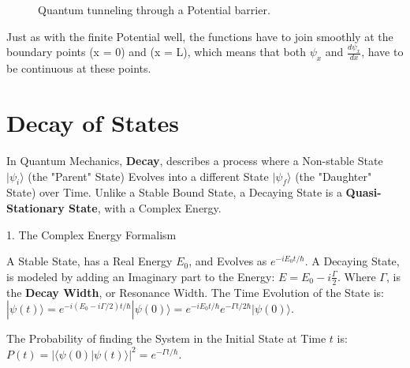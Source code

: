 \documentclass[a4paper, 10pt, onepage]{elegantbook}
\begin{document}
{\begin{figure}[htbp]
\caption{Quantum tunneling through a Potential barrier.}
\end{figure}

Just as with the finite Potential well, the functions have to join smoothly at the boundary points (x = 0) and (x = L), 
which means that both $\psi_x$ and $\frac{d \psi_x}{dx}$, have to be continuous at these points.





\chapter{Decay of States}

In Quantum Mechanics, \textbf{Decay}, describes a process where a Non-stable State $|\psi_i\rangle$ (the "Parent" 
State) Evolves into a different State $|\psi_f\rangle$ (the "Daughter" State) over Time. Unlike a Stable Bound State, a 
Decaying State is a \textbf{Quasi-Stationary State}, with a Complex Energy.

    1. The Complex Energy Formalism  

A Stable State, has a Real Energy $E_0$, and Evolves as $e^{-i E_0 t / \hbar}$. A Decaying State, is modeled by adding 
an Imaginary part to the Energy:  
$ E = E_0 - i\frac{\Gamma}{2} $.  
Where $\Gamma$, is the \textbf{Decay Width}, or Resonance Width. The Time Evolution of the State is:  
$ |\psi(t)\rangle = e^{-i(E_0 - i\Gamma/2)t/\hbar} |\psi(0)\rangle = e^{-i E_0 t / \hbar} e^{-\Gamma t / 2\hbar} 
|\psi(0)\rangle $.  

The Probability of finding the System in the Initial State at Time $t$ is:  
$ P(t) = |\langle \psi(0) | \psi(t) \rangle|^2 = e^{-\Gamma t / \hbar} $.  

}
\end{document}
